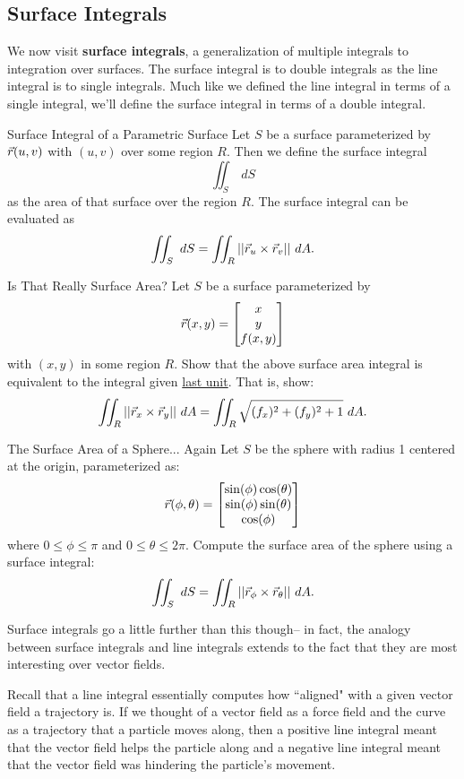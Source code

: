 \subsection{Surface Integrals}
We now visit \textbf{surface integrals}, a generalization of multiple integrals to integration over surfaces. The surface integral is to double integrals as the line integral is to single integrals. Much like we defined the line integral in terms of a single integral, we'll define the surface integral in terms of a double integral.

\begin{definition}{Surface Integral of a Parametric Surface}
Let $S$ be a surface parameterized by $\vec{r}(u,v)$ with $(u,v)$ over some region $R$. Then we define the surface integral $$\iint_S \ dS $$ as the area of that surface over the region $R$. The surface integral can be evaluated as $$\iint_S \ dS= \iint_R ||\vcr_u\times\vcr_v||\ dA.$$
\end{definition}
\begin{exercise}{Is That Really Surface Area?}
Let $S$ be a surface parameterized by $$\vec{r}(x,y)=\begin{bmatrix}x\\y\\f(x,y)\end{bmatrix}$$ with $(x,y)$ in some region $R$. Show that the above surface area integral is equivalent to the integral given \hyperlink{surfarea}{last unit}. That is, show: $$\iint_R ||\vec{r}_x\times\vec{r}_y||\ dA=\iint_R \sqrt{(f_x)^2+(f_y)^2+1}\ dA. $$
\end{exercise}
\begin{exercise}{The Surface Area of a Sphere... Again}
Let $S$ be the sphere with radius 1 centered at the origin, parameterized as: $$\vec{r}(\phi,\theta)=\begin{bmatrix}\sin(\phi)\cos(\theta)\\\sin(\phi)\sin(\theta)\\\cos(\phi)\end{bmatrix} $$ where $0\leq \phi\leq\pi$ and $0\leq \theta\leq 2\pi$. Compute the surface area of the sphere using a surface integral: $$\iint_S \ dS =\iint_R ||\vec{r}_\phi\times\vec{r}_\theta||\ dA.$$
\end{exercise}

Surface integrals go a little further than this though-- in fact, the analogy between surface integrals and line integrals extends to the fact that they are most interesting over vector fields. 

Recall that a line integral essentially computes how ``aligned" with a given vector field a trajectory is. If we thought of a vector field as a force field and the curve as a trajectory that a particle moves along, then a positive line integral meant that the vector field helps the particle along and a negative line integral meant that the vector field was hindering the particle's movement.

